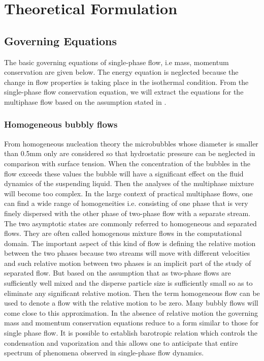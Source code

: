 \chapter{Theoretical Formulation}
\label{chap:chapter2}

\section{Governing Equations}
The basic governing equations of single-phase flow, i.e  mass,
momentum conservation are given below. The energy equation is
neglected because the change in flow properties is taking place in the
isothermal condition.  From the single-phase flow conservation
equation, we will extract the equations for the multiphase flow based on
the assumption stated
in \cite{CavitationandBubbleDynamics.1995,Hidalgo2014}.\\

\subsection{Homogeneous bubbly flows}
From homogeneous nucleation theory
\cite{FundamentalsofCavitation.2004}the microbubbles whose diameter is
smaller than 0.5mm only are considered so that hydrostatic pressure
can be neglected in comparison with surface tension. When the
concentration of the bubbles in the flow exceeds these values the
bubble will have a significant effect on the fluid dynamics of the
suspending liquid.  Then the analyses of the multiphase mixture will
become too complex. In the large context of practical multiphase
flows, one can find a wide range of homogeneities i.e. consisting of
one phase that is very finely dispersed with the other phase of
two-phase flow with a separate stream. The two asymptotic states are
commonly referred to homogeneous and separated flows. They are often
called homogenous mixture flows in the computational domain. The
important aspect of this kind of flow is defining the relative motion
between the two phases because two streams will move with different
velocities and such relative motion between two phases is an implicit
part of the study of separated flow. But based on the assumption that
as two-phase flows are sufficiently well mixed and the disperse
particle size is sufficiently small so as to eliminate any significant
relative motion. Then the term homogeneous flow can be used to
denote a flow with the relative motion to be zero.  Many bubbly flows
will come close to this approximation. In the absence of relative
motion the governing mass and momentum conservation equations reduce
to a form similar to those for single phase flow.  It is possible to
establish barotropic relation which controls the
condensation and vaporization and this allows one to anticipate that
entire spectrum of phenomena observed in single-phase flow dynamics.

